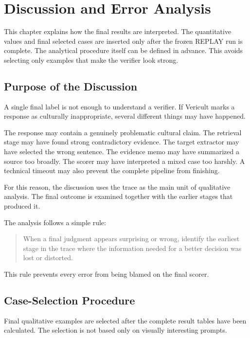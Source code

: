 \chapter{Discussion and Error Analysis}
\label{chap:discussion}

This chapter explains how the final results are interpreted. The quantitative values and final selected cases are inserted only after the frozen REPLAY run is complete. The analytical procedure itself can be defined in advance. This avoids selecting only examples that make the verifier look strong.

\section{Purpose of the Discussion}

A single final label is not enough to understand a verifier. If Vericult marks a response as culturally inappropriate, several different things may have happened.

The response may contain a genuinely problematic cultural claim. The retrieval stage may have found strong contradictory evidence. The target extractor may have selected the wrong sentence. The evidence memo may have summarized a source too broadly. The scorer may have interpreted a mixed case too harshly. A technical timeout may also prevent the complete pipeline from finishing.

For this reason, the discussion uses the trace as the main unit of qualitative analysis. The final outcome is examined together with the earlier stages that produced it.

The analysis follows a simple rule:

\begin{quote}
When a final judgment appears surprising or wrong, identify the earliest stage in the trace where the information needed for a better decision was lost or distorted.
\end{quote}

This rule prevents every error from being blamed on the final scorer.

\section{Case-Selection Procedure}

Final qualitative examples are selected after the complete result tables have been calculated. The selection is not based only on visually interesting prompts.

